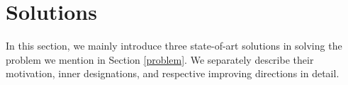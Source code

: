 \section{Solutions}
\label{solutions}
In this section, we mainly introduce three state-of-art solutions in solving the problem we mention in Section \ref{problem}. We separately describe their motivation, inner designations, and respective improving directions in detail.



